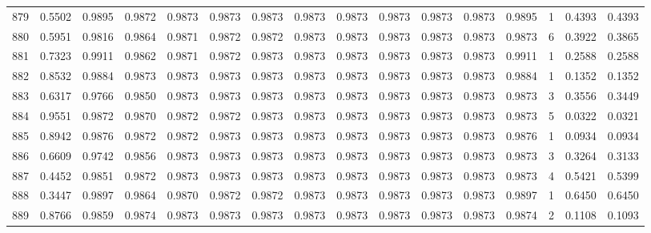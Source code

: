 \begin{tabular}{lrrrrrrrrrrrrrrr}
879 &      0.5502 &  0.9895 &  0.9872 &  0.9873 &  0.9873 &  0.9873 &  0.9873 &  0.9873 &  0.9873 &  0.9873 &   0.9873 &     0.9895 &      1 &                    0.4393 &                     0.4393 \\
880 &      0.5951 &  0.9816 &  0.9864 &  0.9871 &  0.9872 &  0.9872 &  0.9873 &  0.9873 &  0.9873 &  0.9873 &   0.9873 &     0.9873 &      6 &                    0.3922 &                     0.3865 \\
881 &      0.7323 &  0.9911 &  0.9862 &  0.9871 &  0.9872 &  0.9873 &  0.9873 &  0.9873 &  0.9873 &  0.9873 &   0.9873 &     0.9911 &      1 &                    0.2588 &                     0.2588 \\
882 &      0.8532 &  0.9884 &  0.9873 &  0.9873 &  0.9873 &  0.9873 &  0.9873 &  0.9873 &  0.9873 &  0.9873 &   0.9873 &     0.9884 &      1 &                    0.1352 &                     0.1352 \\
883 &      0.6317 &  0.9766 &  0.9850 &  0.9873 &  0.9873 &  0.9873 &  0.9873 &  0.9873 &  0.9873 &  0.9873 &   0.9873 &     0.9873 &      3 &                    0.3556 &                     0.3449 \\
884 &      0.9551 &  0.9872 &  0.9870 &  0.9872 &  0.9872 &  0.9873 &  0.9873 &  0.9873 &  0.9873 &  0.9873 &   0.9873 &     0.9873 &      5 &                    0.0322 &                     0.0321 \\
885 &      0.8942 &  0.9876 &  0.9872 &  0.9872 &  0.9873 &  0.9873 &  0.9873 &  0.9873 &  0.9873 &  0.9873 &   0.9873 &     0.9876 &      1 &                    0.0934 &                     0.0934 \\
886 &      0.6609 &  0.9742 &  0.9856 &  0.9873 &  0.9873 &  0.9873 &  0.9873 &  0.9873 &  0.9873 &  0.9873 &   0.9873 &     0.9873 &      3 &                    0.3264 &                     0.3133 \\
887 &      0.4452 &  0.9851 &  0.9872 &  0.9873 &  0.9873 &  0.9873 &  0.9873 &  0.9873 &  0.9873 &  0.9873 &   0.9873 &     0.9873 &      4 &                    0.5421 &                     0.5399 \\
888 &      0.3447 &  0.9897 &  0.9864 &  0.9870 &  0.9872 &  0.9872 &  0.9873 &  0.9873 &  0.9873 &  0.9873 &   0.9873 &     0.9897 &      1 &                    0.6450 &                     0.6450 \\
889 &      0.8766 &  0.9859 &  0.9874 &  0.9873 &  0.9873 &  0.9873 &  0.9873 &  0.9873 &  0.9873 &  0.9873 &   0.9873 &     0.9874 &      2 &                    0.1108 &                     0.1093 \\

\end{tabular}
